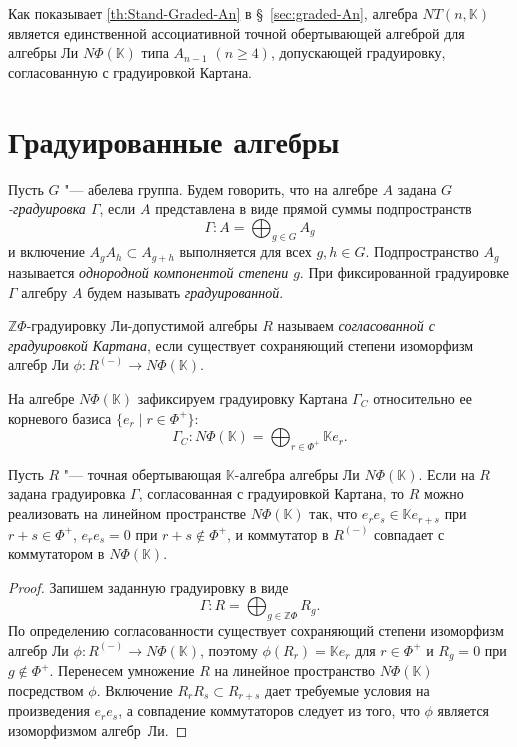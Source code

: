 \documentclass[a4paper,14pt,oneside,openany]{memoir}
\begin{document}
Как показывает \cref{th:Stand-Graded-An} в \S~\ref{sec:graded-An}, алгебра
$NT(n, \mathbb{K})$ является единственной ассоциативной точной обертывающей
алгеброй для алгебры Ли $N\Phi(\mathbb{K})$ типа $A_{n-1}$ $(n \geq 4)$,
допускающей градуировку, согласованную с градуировкой Картана.

\section{Градуированные алгебры}\label{sec:graded-algebras}

Пусть $G$ "--- абелева группа. Будем говорить, что на алгебре $A$ задана
\emph{$G$\nobreakdash-градуировка $\Gamma$}, если $A$ представлена в виде
прямой суммы подпространств
\[
    \Gamma\colon A = \bigoplus_{g \in G}A_g
\]
и включение $A_{g}A_{h} \subset A_{g+h}$ выполняется для всех $g, h \in G$.
Подпространство $A_g$ называется \emph{однородной компонентой степени $g$}. При
фиксированной градуировке $\Gamma$ алгебру $A$ будем называть
\emph{градуированной}.

$\mathbb{Z}\Phi$-градуировку Ли-допустимой алгебры $R$ называем
\emph{согласованной с градуировкой Картана}, если существует сохраняющий
степени изоморфизм алгебр Ли $\phi\colon R^{(-)}\to N\Phi(\mathbb{K})$.

На алгебре $N\Phi(\mathbb{K})$ зафиксируем градуировку Картана $\Gamma_C$
относительно
ее корневого базиса $\{e_r\mid r\in\Phi^+\}$:
\begin{equation*}%
    \Gamma_C\colon N\Phi(\mathbb{K})=
    \bigoplus_{r\in\Phi^+}\mathbb{K}e_r
    .
\end{equation*}

\begin{lemma}\label{l:enveloping-roots-grading}
    Пусть $R$ "--- точная обертывающая $\mathbb{K}$-алгебра алгебры Ли
    $N\Phi(\mathbb{K})$. Если на $R$ задана градуировка $\Gamma$, согласованная с
    градуировкой Картана, то $R$ можно реализовать на линейном пространстве
    $N\Phi(\mathbb{K})$ так, что $e_re_s \in \mathbb{K}e_{r+s}$ при $r+s \in
    \Phi^{+}$, $e_re_s = 0$ при $r+s \not\in \Phi^{+}$, и коммутатор в $R^{(-)}$
    совпадает с коммутатором в $N\Phi(\mathbb{K})$.
\end{lemma}
\begin{proof}
    Запишем заданную градуировку в виде
    \begin{equation*}
        \Gamma\colon R=\bigoplus_{g\in\mathbb{Z}\Phi}R_g.
    \end{equation*}
    По определению согласованности существует сохраняющий степени изоморфизм
    алгебр Ли $\phi\colon R^{(-)}\to N\Phi(\mathbb{K})$, поэтому
    $\phi(R_r)=\mathbb{K}e_r$ для $r\in\Phi^+$ и $R_g=0$ при
    $g\not\in\Phi^+$. Перенесем умножение $R$ на линейное пространство
    $N\Phi(\mathbb{K})$ посредством $\phi$. Включение $R_rR_s\subset R_{r+s}$
    дает требуемые условия на произведения $e_re_s$, а совпадение коммутаторов
    следует из того, что $\phi$ является изоморфизмом алгебр~Ли.
\end{proof}
\end{document}
